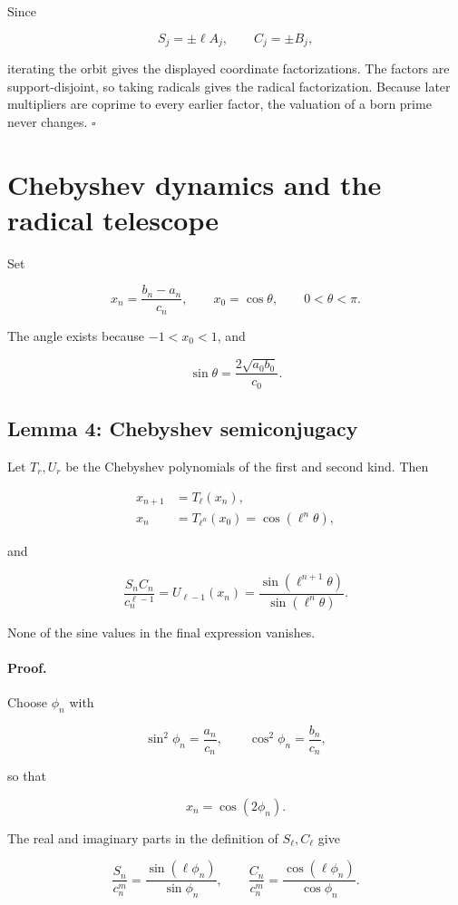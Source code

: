 \documentclass[11pt]{article}
\begin{document}
Since

\[
S_j=\pm\ell A_j,
\qquad
C_j=\pm B_j,
\]

iterating the orbit gives the displayed coordinate factorizations. The
factors are support-disjoint, so taking radicals gives the radical
factorization. Because later multipliers are coprime to every earlier
factor, the valuation of a born prime never changes. \(\square\)

\section{Chebyshev dynamics and the radical telescope}

Set

\[
x_n=\frac{b_n-a_n}{c_n},
\qquad
x_0=\cos\theta,
\qquad
0<\theta<\pi.
\]

The angle exists because \(-1<x_0<1\), and

\[
\sin\theta
=
\frac{2\sqrt{a_0b_0}}{c_0}.
\]

\subsection{Lemma 4: Chebyshev semiconjugacy}

Let \(T_r,U_r\) be the Chebyshev polynomials of the first and second kind.
Then

\[
\begin{aligned}
x_{n+1}
&=
T_\ell(x_n),\\
x_n
&=
T_{\ell^n}(x_0)
=
\cos(\ell^n\theta),
\end{aligned}
\]

and

\[
\frac{S_nC_n}{c_n^{\ell-1}}
=
U_{\ell-1}(x_n)
=
\frac{\sin(\ell^{n+1}\theta)}
{\sin(\ell^n\theta)}.
\]

None of the sine values in the final expression vanishes.

\paragraph{Proof.}

Choose \(\phi_n\) with

\[
\sin^2\phi_n=\frac{a_n}{c_n},
\qquad
\cos^2\phi_n=\frac{b_n}{c_n},
\]

so that

\[
x_n=\cos(2\phi_n).
\]

The real and imaginary parts in the definition of \(S_\ell,C_\ell\) give

\[
\frac{S_n}{c_n^m}
=
\frac{\sin(\ell\phi_n)}{\sin\phi_n},
\qquad
\frac{C_n}{c_n^m}
=
\frac{\cos(\ell\phi_n)}{\cos\phi_n}.
\]
\end{document}

